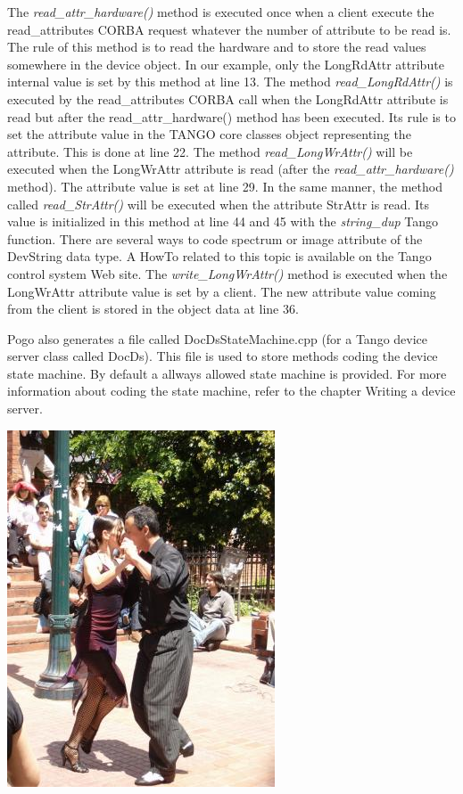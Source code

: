 The \emph{read\_attr\_hardware()} method
is executed once when a client execute the read\_attributes
CORBA request whatever the number of attribute to be read is. The
rule of this method is to read the hardware and to store the read
values somewhere in the device object. In our example, only the LongRdAttr
attribute internal value is set by this method at line 13. The method
\emph{read\_LongRdAttr()} is executed by the read\_attributes
CORBA call when the LongRdAttr attribute is read but after the read\_attr\_hardware()
method has been executed. Its rule is to set the attribute value in
the TANGO core classes object representing the attribute. This is
done at line 22. The method \emph{read\_LongWrAttr()} will be executed
when the LongWrAttr attribute is read (after the \emph{read\_attr\_hardware()}
method). The attribute value is set at line 29. In the same manner,
the method called \emph{read\_StrAttr()} will be executed when the
attribute StrAttr is read. Its value is initialized in this method
at line 44 and 45 with the \emph{string\_dup} Tango
function. There are several ways to code spectrum or image attribute
of the DevString data type. A HowTo related to this topic is available
on the Tango control system Web site. The \emph{write\_LongWrAttr()}
method is executed when the LongWrAttr attribute
value is set by a client. The new attribute value coming from the
client is stored in the object data at line 36.

Pogo also generates a file called \textquotedbl{}DocDsStateMachine.cpp\textquotedbl{}
(for a Tango device server class called DocDs). This file is used
to store methods coding the device state machine. By default a allways
allowed state machine is provided. For more information about coding
the state machine, refer to the chapter \textquotedbl{}Writing a device
server\textquotedbl{}.

\newpage{}

\vspace{5cm}


\begin{center}
\label{APicture}\includegraphics{dance/tg_argentine}
\par\end{center}
